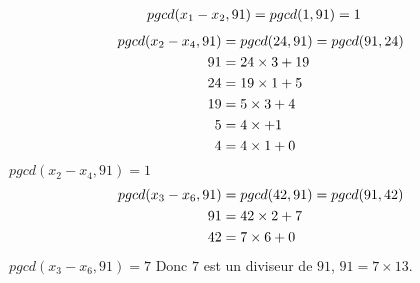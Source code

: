 \documentclass[a4paper,10pt]{article}
\begin{document}
	\begin{align}
		pgcd(x_1-x_2,91) &= pgcd(1,91)=1 \notag
	\end{align}	
	\begin{align}	
		pgcd(x_2-x_4,91) &= pgcd(24,91)= pgcd(91,24)\notag \\
		91 &= 24 \times 3 + 19 \notag \\
		24 &= 19 \times 1 + 5 \notag \\
		19 &= 5 \times 3 + 4 \notag \\
		5 &= 4 \times + 1 \notag \\
		4 &= 4 \times 1 + 0 \notag
	\end{align}
		$pgcd(x_2-x_4,91)=1$
	\begin{align}	
		pgcd(x_3-x_6,91) &= pgcd(42,91)= pgcd(91,42)\notag \\
		91 &= 42 \times 2 + 7 \notag \\
		42 &= 7 \times 6 + 0\notag
	\end{align}
		$pgcd(x_3-x_6,91) = 7$
	Donc $7$ est un diviseur de $91$, $91=7 \times 13$.
\end{document}
